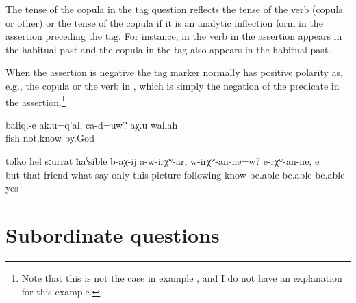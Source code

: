 The tense of the copula in the tag question reflects the tense of the verb (copula or other) or the tense of the copula if it is an analytic inflection form in the assertion preceding the tag. For instance, in  the verb in the assertion appears in the habitual past and the copula in the tag also appears in the habitual past.

When the assertion is negative the tag marker normally has positive polarity as, e.g., the copula   or the verb in , which is simply the negation of the predicate in the assertion.\footnote{Note that this is not the case in example , and I do not have an explanation for this example.}
%
\begin{exe}
	\ex	\label{ex:(These) are not fish, are they? By God, I don't know}
	\gll	baliqː-e	akːu=q'al,	ca-d=uw? 	aχːu	wallah\\
		fish		 	not.know	by.God\\
	\glt	{}

	\ex	\label{ex:And these friends, what they are saying, only by means of the picture, (one) cannot know, can one? One cannot know, yes}
	\gll	[a	iš-tːi	juldašː-e	ce	b-ik'-ul=el]	tolko	hel sːurrat	ħaˁsible	b-aχ-ij	a-w-irχʷ-ar,	w-irχʷ-an-ne=w? 		e-rχʷ-an-ne,	e\\
		but	that	friend	what	say	only	this picture	following	know	be.able be.able	be.able	yes\\
	\glt	{}
\end{exe}



\section{Subordinate questions}
\label{sec:Subordinate questions}

